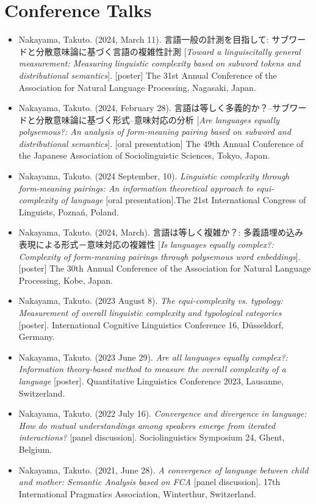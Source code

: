 \documentclass[a4paper,11pt]{article}
\begin{document}
\section*{Conference Talks}
\begin{itemize}[leftmargin=*, itemsep=0em, topsep=0em]
  \item Nakayama, Takuto. (2024, March 11). 言語一般の計測を目指して: サブワードと分散意味論に基づく言語の複雑性計測 [\textit{Toward a linguiscitally general measurement: Measuring linguistic complexity based on subword tokens and distributional semantics}]. [poster] The 31st Annual Conference of the Association for Natural Language Processing, Nagasaki, Japan.
  \item Nakayama, Takuto. (2024, February 28). 言語は等しく多義的か？–サブワードと分散意味論に基づく形式–意味対応の分析 [\textit{Are languages equally polysemous?: An analysis of form-meaning pairing based on subword and distributional semantics}]. [oral presentation] The 49th Annual Conference of the Japanese Association of Sociolinguistic Sciences, Tokyo, Japan.
  \item Nakayama, Takuto. (2024 September, 10). \textit{Linguistic complexity through form-meaning pairings: An information theoretical approach to equi-complexity of language} [oral presentation].The 21st International Congress of Linguists, Poznań, Poland.
  \item Nakayama, Takuto. (2024, March). 言語は等しく複雑か？: 多義語埋め込み表現による形式－意味対応の複雑性 [\textit{Is languages equally complex?: Complexity of form-meaning pairings through polysemous word enbeddings}]. [poster] The 30th Annual Conference of the Association for Natural Language Processing, Kobe, Japan.
  \item Nakayama, Takuto. (2023 August 8). \textit{The equi-complexity vs. typology: Measurement of overall linguistic complexity and typological categories} [poster]. International Cognitive Linguistics Conference 16, Düsseldorf, Germany.
  \item Nakayama, Takuto. (2023 June 29). \textit{Are all languages equally complex?: Information theory-based method to measure the overall complexity of a language} [poster]. Quantitative Linguistics Conference 2023, Lausanne, Switzerland.
  \item Nakayama, Takuto. (2022 July 16). \textit{Convergence and divergence in language: How do mutual understandings among speakers emerge from iterated interactions?} [panel discussion]. Sociolinguistics Symposium 24, Ghent, Belgium.
  \item Nakayama, Takuto. (2021, June 28). \textit{A convergence of language between child and mother: Semantic Analysis based on FCA} [panel discussion]. 17th International Pragmatics Association, Winterthur, Switzerland.
\end{itemize}
\end{document}
